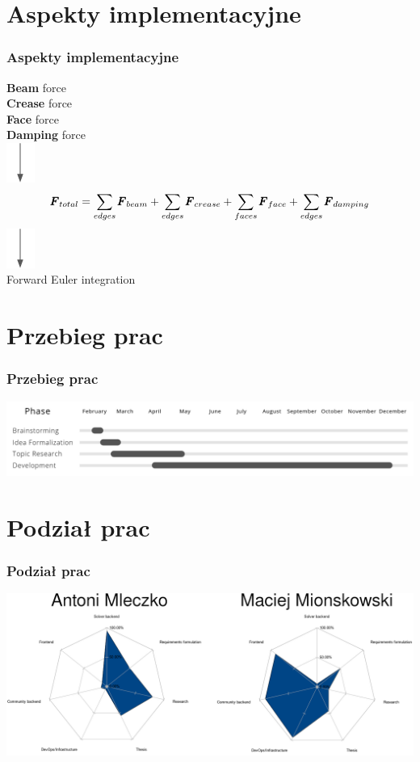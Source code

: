 \documentclass{beamer}
\begin{document}
\section{Aspekty implementacyjne}
\begin{frame}
  \frametitle{Aspekty implementacyjne}
  \centering
  	\textbf{Beam} force \\
  	\textbf{Crease} force \\
  	\textbf{Face} force \\
  	\textbf{Damping} force \\
	\vspace{0.5ex}
	\includegraphics[width=0.03\linewidth]{assets/arrow-down.png}
	\vspace{-2ex}
	\begin{equation*} 
		\pmb{F}_{total} = \sum_{edges} \pmb{F}_{beam} + \sum_{edges} \pmb{F}_{crease} + \sum_{faces}\pmb{F}_{face} + \sum_{edges}\pmb{F}_{damping}
		\vspace{-2ex}
	\end{equation*}
	\includegraphics[width=0.03\linewidth]{assets/arrow-down.png} \\
	Forward Euler integration
\end{frame}

\section{Przebieg prac}
\begin{frame}
  \frametitle{Przebieg prac}
  \centering
	\includegraphics[width=\linewidth]{assets/4-phases.png} \\
\end{frame}

\section{Podział prac}
\begin{frame}
  \frametitle{Podział prac}
  	\hspace{-2ex}\includegraphics[width=1.04\linewidth]{assets/pres-contribution.png} \\
\end{frame}
\end{document}
